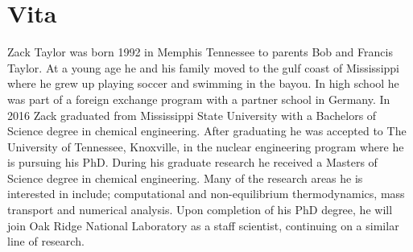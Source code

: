 \chapter*{Vita} \label{ch:vita}
Zack Taylor was born 1992 in Memphis Tennessee to parents Bob and Francis Taylor. At a young age he and his family moved to the gulf coast of Mississippi where he grew up playing soccer and swimming in the bayou. In high school he was part of a foreign exchange program with a partner school in Germany. In 2016 Zack graduated from Mississippi State University with a Bachelors of Science degree in chemical engineering. After graduating he was accepted to The University of Tennessee, Knoxville, in the nuclear engineering program where he is pursuing his PhD. During his graduate research he received a Masters of Science degree in chemical engineering. Many of the research areas he is interested in include; computational and non-equilibrium thermodynamics, mass transport and numerical analysis. Upon completion of his PhD degree, he will join Oak Ridge National Laboratory as a staff scientist, continuing on a similar line of research.